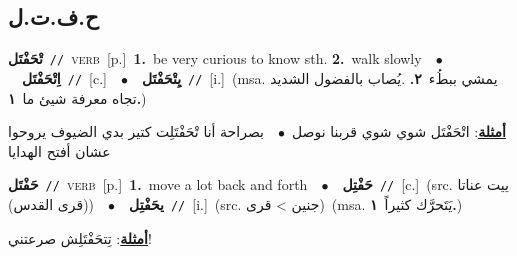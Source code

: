\documentclass[10pt,a4paper,twoside]{article} %
\begin{document}
\begin{multicols}{2}
\vspace{-3mm}
\subsection*{\color{blue}\foreignlanguage{arabic}{ح.ف.ت.ل}\color{blue}{}} 

{\setlength\topsep{0pt}\textbf{\foreignlanguage{arabic}{تْحَفْتَل}}\ {\color{gray}\texttt{//}\color{black}}\ \textsc{verb}\ [p.]\ \textbf{1.}~be very curious to know sth.  \textbf{2.}~walk slowly\ \ $\bullet$\ \ \setlength\topsep{0pt}\textbf{\foreignlanguage{arabic}{اِتْحَفْتَل}}\ {\color{gray}\texttt{//}\color{black}}\ [c.]\ \ $\bullet$\ \ \setlength\topsep{0pt}\textbf{\foreignlanguage{arabic}{يِتْحَفْتَل}}\ {\color{gray}\texttt{//}\color{black}}\ [i.]\ \color{gray}(msa. \foreignlanguage{arabic}{يمشي ببطُء}~\foreignlanguage{arabic}{\textbf{٢.}}  .\foreignlanguage{arabic}{يُصاب بالفضول الشديد تجاه معرفة شيئ ما}~\foreignlanguage{arabic}{\textbf{١.}})\color{black}\  \begin{flushright}\color{gray}\foreignlanguage{arabic}{\textbf{\underline{\foreignlanguage{arabic}{أمثلة}}}: اتْحَفْتَل شوي شوي قربنا نوصل\ $\bullet$\ \  بصراحة أنا تْحَفْتَلِت كتير بدي الضيوف يروحوا عشان أفتح الهدايا}\end{flushright}\color{black}} \vspace{2mm}

{\setlength\topsep{0pt}\textbf{\foreignlanguage{arabic}{حَفْتَل}}\ {\color{gray}\texttt{//}\color{black}}\ \textsc{verb}\ [p.]\ \textbf{1.}~move a lot back and forth\ \ $\bullet$\ \ \setlength\topsep{0pt}\textbf{\foreignlanguage{arabic}{حَفْتِل}}\ {\color{gray}\texttt{//}\color{black}}\ [c.]\ (src. \color{gray}\foreignlanguage{arabic}{ييت عناتا (قرى القدس)}\color{black})\ \ $\bullet$\ \ \setlength\topsep{0pt}\textbf{\foreignlanguage{arabic}{يحَفْتِل}}\ {\color{gray}\texttt{//}\color{black}}\ [i.]\ (src. \color{gray}\foreignlanguage{arabic}{جنين > قرى}\color{black})\ \color{gray}(msa. \foreignlanguage{arabic}{يَتَحرَّك كثيراً}~\foreignlanguage{arabic}{\textbf{١.}})\color{black}\  \begin{flushright}\color{gray}\foreignlanguage{arabic}{\textbf{\underline{\foreignlanguage{arabic}{أمثلة}}}: تِتحَفْتَلِش صرعتني!}\end{flushright}\color{black}} \vspace{2mm}


\end{multicols}
\end{document}
